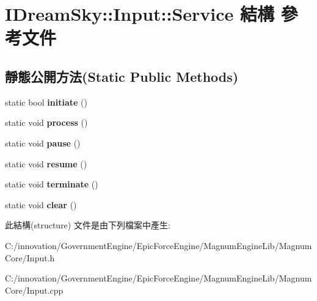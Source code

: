 \hypertarget{struct_i_dream_sky_1_1_input_1_1_service}{}\section{I\+Dream\+Sky\+:\+:Input\+:\+:Service 結構 參考文件}
\label{struct_i_dream_sky_1_1_input_1_1_service}
\subsection*{靜態公開方法(Static Public Methods)}
\begin{DoxyCompactItemize}
\item 
static bool {\bfseries initiate} ()\hypertarget{struct_i_dream_sky_1_1_input_1_1_service_aa39ce3d3cc57c5f0230d8940cc10a1be}{}\label{struct_i_dream_sky_1_1_input_1_1_service_aa39ce3d3cc57c5f0230d8940cc10a1be}

\item 
static void {\bfseries process} ()\hypertarget{struct_i_dream_sky_1_1_input_1_1_service_a6127b6b710c56c83ca0ee3178dccb268}{}\label{struct_i_dream_sky_1_1_input_1_1_service_a6127b6b710c56c83ca0ee3178dccb268}

\item 
static void {\bfseries pause} ()\hypertarget{struct_i_dream_sky_1_1_input_1_1_service_a27821e5f2c3101304281ad1de2d33d4e}{}\label{struct_i_dream_sky_1_1_input_1_1_service_a27821e5f2c3101304281ad1de2d33d4e}

\item 
static void {\bfseries resume} ()\hypertarget{struct_i_dream_sky_1_1_input_1_1_service_a2f34ea54a965606801179a06248a058d}{}\label{struct_i_dream_sky_1_1_input_1_1_service_a2f34ea54a965606801179a06248a058d}

\item 
static void {\bfseries terminate} ()\hypertarget{struct_i_dream_sky_1_1_input_1_1_service_a02867e649e7e9455ef771ec9fe6e4a1e}{}\label{struct_i_dream_sky_1_1_input_1_1_service_a02867e649e7e9455ef771ec9fe6e4a1e}

\item 
static void {\bfseries clear} ()\hypertarget{struct_i_dream_sky_1_1_input_1_1_service_a29689d1a76f06d9e8be3e0cfbb02b21e}{}\label{struct_i_dream_sky_1_1_input_1_1_service_a29689d1a76f06d9e8be3e0cfbb02b21e}

\end{DoxyCompactItemize}


此結構(structure) 文件是由下列檔案中產生\+:\begin{DoxyCompactItemize}
\item 
C\+:/innovation/\+Government\+Engine/\+Epic\+Force\+Engine/\+Magnum\+Engine\+Lib/\+Magnum\+Core/Input.\+h\item 
C\+:/innovation/\+Government\+Engine/\+Epic\+Force\+Engine/\+Magnum\+Engine\+Lib/\+Magnum\+Core/Input.\+cpp\end{DoxyCompactItemize}
